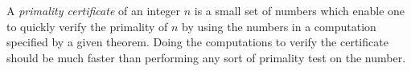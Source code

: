 \documentclass[12pt]{article}
\begin{document}
A {\em primality certificate} of an integer $n$ is a small set of numbers which enable one to quickly verify the primality of $n$ by using the numbers in a computation specified by a given theorem. Doing the computations to verify the certificate should be much faster than performing any sort of primality test on the number.
\end{document}
